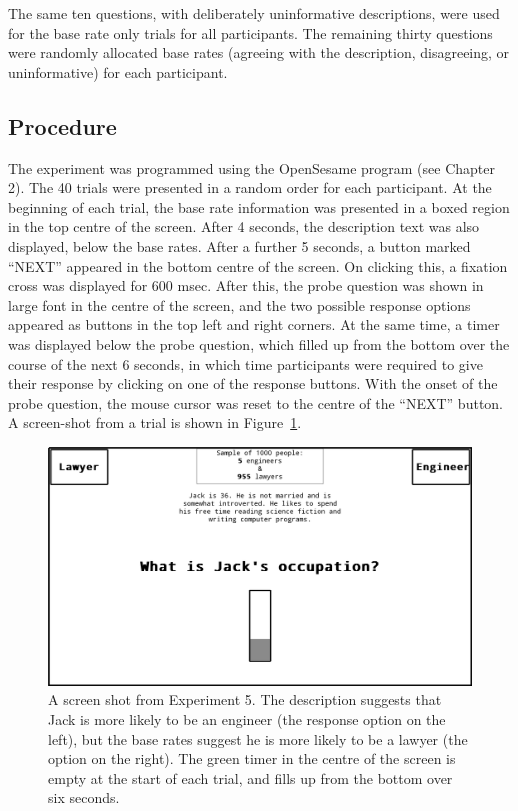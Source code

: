 The same ten questions, with deliberately uninformative descriptions,
were used for the base rate only trials for all participants.
The remaining thirty questions were randomly allocated base rates
(agreeing with the description, disagreeing, or uninformative)
for each participant.


\subsection{Procedure} \label{subsec:Procedure}

The experiment was programmed using the OpenSesame program (see Chapter 2).
The 40 trials were presented in a random order for each participant.
At the beginning of each trial, the base rate information
was presented in a boxed region in the top centre of the screen.
After 4 seconds, the description text was also displayed, below the base rates.
After a further 5 seconds, a button marked ``NEXT''
appeared in the bottom centre of the screen.
On clicking this, a fixation cross was displayed for 600 msec.
After this, the probe question was shown
in large font in the centre of the screen,
and the two possible response options appeared as buttons
in the top left and right corners.
At the same time, a timer was displayed below the probe question,
which filled up from the bottom over the course of
the next 6 seconds, in which time participants were required to
give their response by clicking on one of the response buttons.
With the onset of the probe question,
the mouse cursor was reset to the centre of the ``NEXT'' button.
A screen-shot from a trial is shown in Figure~\ref{fig:exp5_screenshot}.

\begin{figure}[ht]
  \centering
  \includegraphics[width=\figurewidth]{imgs/exp5_screenshot.png}
  \caption[A screen shot from Experiment 5.]{
    \label{fig:exp5_screenshot}
    A screen shot from Experiment 5.
    The description suggests that Jack is more likely to be an engineer
    (the response option on the left),
    but the base rates suggest he is more likely to be a lawyer
    (the option on the right).
    The green timer in the centre of the screen
    is empty at the start of each trial,
    and fills up from the bottom over six seconds.
  }
\end{figure}


